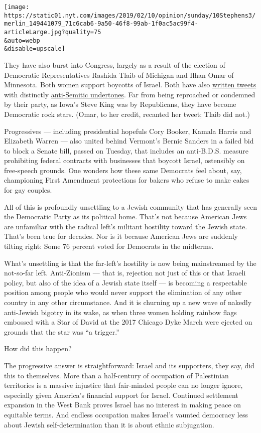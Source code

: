 \texttt{[image: https://static01.nyt.com/images/2019/02/10/opinion/sunday/10Stephens3/merlin\_149441079\_71c6cab6-9a50-46f8-99ab-1f0ac5ac99f4-articleLarge.jpg?quality=75\\\&auto=webp\\\&disable=upscale]}

They have also burst into Congress, largely as a result of the election
of Democratic Representatives Rashida Tlaib of Michigan and Ilhan Omar
of Minnesota. Both women support boycotts of Israel. Both have also
\href{https://twitter.com/rashidatlaib/status/1082095303325609984?lang=en}{written
tweets} with distinctly
\href{https://twitter.com/ilhanmn/status/269488770066313216?lang=en}{anti-Semitic
undertones}. Far from being reproached or condemned by their party, as
Iowa's Steve King was by Republicans, they have become Democratic rock
stars. (Omar, to her credit, recanted her tweet; Tlaib did not.)

Progressives --- including presidential hopefuls Cory Booker, Kamala
Harris and Elizabeth Warren --- also united behind Vermont's Bernie
Sanders in a failed bid to block a Senate bill, passed on Tuesday, that
includes an anti-B.D.S. measure prohibiting federal contracts with
businesses that boycott Israel, ostensibly on free-speech grounds. One
wonders how these same Democrats feel about, say, championing First
Amendment protections for bakers who refuse to make cakes for gay
couples.

All of this is profoundly unsettling to a Jewish community that has
generally seen the Democratic Party as its political home. That's not
because American Jews are unfamiliar with the radical left's militant
hostility toward the Jewish state. That's been true for decades. Nor is
it because American Jews are suddenly tilting right: Some 76 percent
voted for Democrats in the midterms.

What's unsettling is that the far-left's hostility is now being
mainstreamed by the not-so-far left. Anti-Zionism --- that is, rejection
not just of this or that Israeli policy, but also of the idea of a
Jewish state itself --- is becoming a respectable position among people
who would never support the elimination of any other country in any
other circumstance. And it is churning up a new wave of nakedly
anti-Jewish bigotry in its wake, as when three women holding rainbow
flags embossed with a Star of David at the 2017 Chicago Dyke March were
ejected on grounds that the star was ``a trigger.''

How did this happen?

The progressive answer is straightforward: Israel and its supporters,
they say, did this to themselves. More than a half-century of occupation
of Palestinian territories is a massive injustice that fair-minded
people can no longer ignore, especially given America's financial
support for Israel. Continued settlement expansion in the West Bank
proves Israel has no interest in making peace on equitable terms. And
endless occupation makes Israel's vaunted democracy less about Jewish
self-determination than it is about ethnic subjugation.


